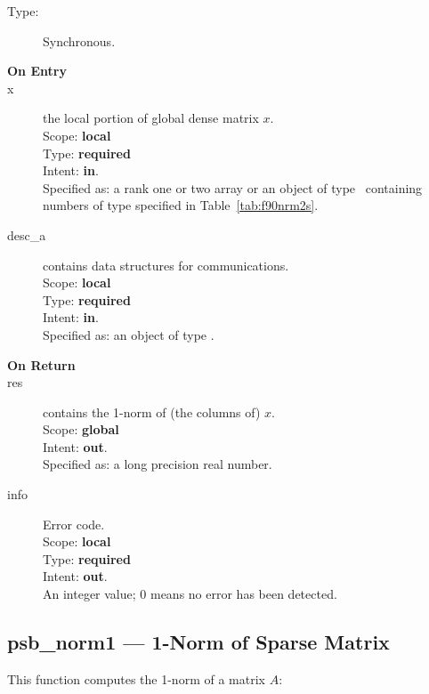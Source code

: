 \begin{description}
\item[Type:] Synchronous.
\item[\bf On Entry]
\item[x] the local portion of global dense matrix
$x$. %
\\
Scope: {\bf local} \\
Type: {\bf required} \\
Intent: {\bf in}.\\
Specified as: a rank one or two array or an object of type \vdata\
containing numbers of type specified in
Table~\ref{tab:f90nrm2s}.
\item[desc\_a] contains data structures for communications.\\
Scope: {\bf local} \\
Type: {\bf required}\\
Intent: {\bf in}.\\
Specified as: an object of type \descdata.

\item[\bf On Return]
\item[res] contains the 1-norm of (the columns of) $x$.\\
Scope: {\bf global} \\
Intent: {\bf out}.\\
Specified as: a long precision real  number.
\item[info] Error code.\\
Scope: {\bf local} \\
Type: {\bf required} \\
Intent: {\bf out}.\\
An integer value; 0 means no error has been detected.
\end{description}



%
%


\clearpage\subsection{psb\_norm1 --- 1-Norm of Sparse Matrix}

This function computes the 1-norm of a matrix $A$:\\


